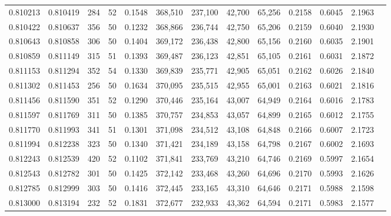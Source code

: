 \begin{tabular}{rrrrrrrrrrrrr}
0.810213 & 0.810419 &   284 &  52 &                                     0.1548 & 368,510 & 237,100 &  42,700 &  65,256 & 0.2158 & 0.6045 & 2.1963 \\
0.810422 & 0.810637 &   356 &  50 &                                     0.1232 & 368,866 & 236,744 &  42,750 &  65,206 & 0.2159 & 0.6040 & 2.1930 \\
0.810643 & 0.810858 &   306 &  50 &                                     0.1404 & 369,172 & 236,438 &  42,800 &  65,156 & 0.2160 & 0.6035 & 2.1901 \\
0.810859 & 0.811149 &   315 &  51 &                                     0.1393 & 369,487 & 236,123 &  42,851 &  65,105 & 0.2161 & 0.6031 & 2.1872 \\
0.811153 & 0.811294 &   352 &  54 &                                     0.1330 & 369,839 & 235,771 &  42,905 &  65,051 & 0.2162 & 0.6026 & 2.1840 \\
0.811302 & 0.811453 &   256 &  50 &                                     0.1634 & 370,095 & 235,515 &  42,955 &  65,001 & 0.2163 & 0.6021 & 2.1816 \\
0.811456 & 0.811590 &   351 &  52 &                                     0.1290 & 370,446 & 235,164 &  43,007 &  64,949 & 0.2164 & 0.6016 & 2.1783 \\
0.811597 & 0.811769 &   311 &  50 &                                     0.1385 & 370,757 & 234,853 &  43,057 &  64,899 & 0.2165 & 0.6012 & 2.1755 \\
0.811770 & 0.811993 &   341 &  51 &                                     0.1301 & 371,098 & 234,512 &  43,108 &  64,848 & 0.2166 & 0.6007 & 2.1723 \\
0.811994 & 0.812238 &   323 &  50 &                                     0.1340 & 371,421 & 234,189 &  43,158 &  64,798 & 0.2167 & 0.6002 & 2.1693 \\
0.812243 & 0.812539 &   420 &  52 &                                     0.1102 & 371,841 & 233,769 &  43,210 &  64,746 & 0.2169 & 0.5997 & 2.1654 \\
0.812543 & 0.812782 &   301 &  50 &                                     0.1425 & 372,142 & 233,468 &  43,260 &  64,696 & 0.2170 & 0.5993 & 2.1626 \\
0.812785 & 0.812999 &   303 &  50 &                                     0.1416 & 372,445 & 233,165 &  43,310 &  64,646 & 0.2171 & 0.5988 & 2.1598 \\
0.813000 & 0.813194 &   232 &  52 &                                     0.1831 & 372,677 & 232,933 &  43,362 &  64,594 & 0.2171 & 0.5983 & 2.1577 \\

\end{tabular}
